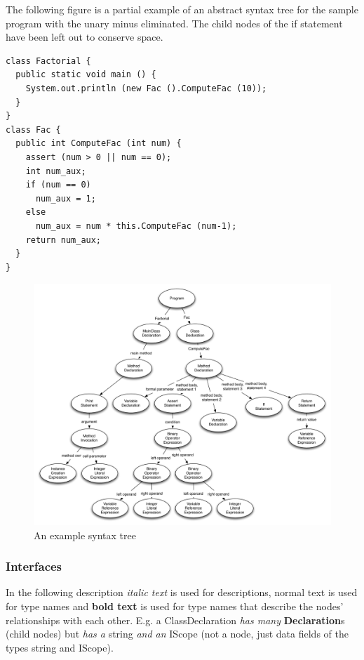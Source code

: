\documentclass[a4paper,11pt]{article}
\begin{document}
The following figure is a partial example of an abstract syntax tree for the sample program with the unary minus eliminated. The child nodes of the if statement have been left out to conserve space.

\begin{verbatim}
class Factorial {
  public static void main () {
    System.out.println (new Fac ().ComputeFac (10));
  }
}
class Fac {
  public int ComputeFac (int num) {
    assert (num > 0 || num == 0);
    int num_aux;
    if (num == 0)
      num_aux = 1;
    else 
      num_aux = num * this.ComputeFac (num-1);
    return num_aux;
  }
}
\end{verbatim}

\begin{figure}[h!]
\centering
\includegraphics[width=1.0\textwidth]{syntaxtree.pdf}
\caption{An example syntax tree}
\end{figure}

\subsubsection{Interfaces}

In the following description \emph{italic text} is used for descriptions, normal text is used for type names and \textbf{bold text} is used for type names that describe the nodes' relationships with each other. E.g. a ClassDeclaration \emph{has many} \textbf{Declaration}s (child nodes) but \emph{has a} string \emph{and an} IScope (not a node, just data fields of the types string and IScope).
\end{document}
